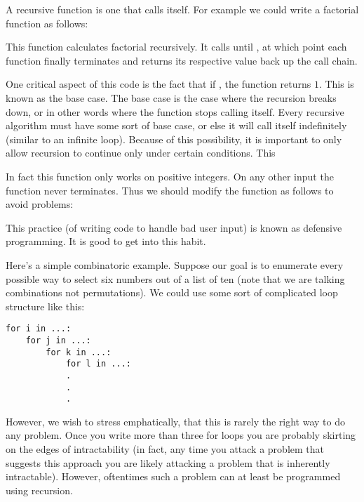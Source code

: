 

A recursive function is one that calls itself. For example we could write a factorial function as follows:



This function calculates factorial recursively. It calls  until , at which point each function finally terminates and returns its respective value back up the call chain.

One critical aspect of this code is the fact that if , the function returns $1$. This is known as the base case. The base case is the case where the recursion breaks down, or in other words where the function stops calling itself. Every recursive algorithm must have some sort of base case, or else it will call itself indefinitely (similar to an infinite loop).  Because of this possibility, it is important to only allow recursion to continue only under certain conditions.  This

In fact this function only works on positive integers. On any other input the function never terminates. Thus we should modify the function as follows to avoid problems:



This practice (of writing code to handle bad user input) is known as defensive programming. It is good to get into this habit.

Here's a simple combinatoric example. Suppose our goal is to enumerate every possible way to select six numbers out of a list of ten (note that we are talking combinations not permutations). We could use some sort of complicated  loop structure like this:

\begin{lstlisting}
for i in ...:
    for j in ...:
        for k in ...:
            for l in ...:
            .
            .
            .
\end{lstlisting}

However, we wish to stress emphatically, that this is rarely the right way to do any problem. Once you write more than three for loops you are probably skirting on the edges of intractability (in fact, any time you attack a problem that suggests this approach you are likely attacking a problem that is inherently intractable). However, oftentimes such a problem can at least be programmed using recursion.


